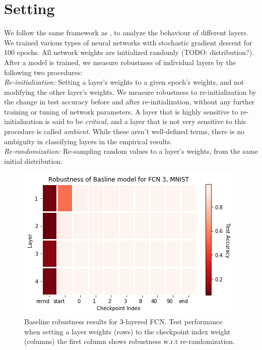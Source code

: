 \documentclass{article}
\begin{document}
\section{Setting}
We follow the same framework as \cite{allLayers}, to analyze the behaviour of different layers. We trained various types of neural networks with stochastic gradient descent for 100 epochs. All network weights are initialized randomly (TODO: distribution?). After a model is trained, we measure robustness of individual layers by the following two procedures:\\
\emph{Re-initialization:} Setting a layer's weights to a given epoch's weights, and not modifying the other layer's weights. We measure robustness to re-initialization by the change in test accuracy before and after re-initialization, without any further training or tuning of network parameters. A layer that is highly sensitive to re-initialization is said to be \emph{critical}, and a layer that is not very sensitive to this procedure is called \emph{ambient}. While these aren't well-defined terms, there is no ambiguity in classifying layers in the empirical results. \\
\emph{Re-randomization:} Re-sampling random values to a layer's weights, from the same initial distribution. \\
\begin{figure}
  \includegraphics[width=\linewidth]{images/baseline_fc3_mnist_heatmap.png}
  \caption{Baseline robustness results for 3-layered FCN. Test performance when setting a layer weights (rows) to the checkpoint index weight (columns) the first column shows robustness w.r.t re-randomization.}
  \label{fig:baseline_fc3_heatmap}
\end{figure}
\end{document}
